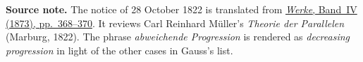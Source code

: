 \par\medskip\begin{small}\noindent\textbf{Source note.} The notice of 28 October 1822 is translated from \href{https://gdz.sub.uni-goettingen.de/id/PPN236005081}{\textit{Werke}, Band~IV (1873), pp.~368--370}. It reviews Carl Reinhard Müller's \textit{Theorie der Parallelen} (Marburg, 1822). The phrase \textit{abweichende Progression} is rendered as \textit{decreasing progression} in light of the other cases in Gauss's list.\par\end{small}
